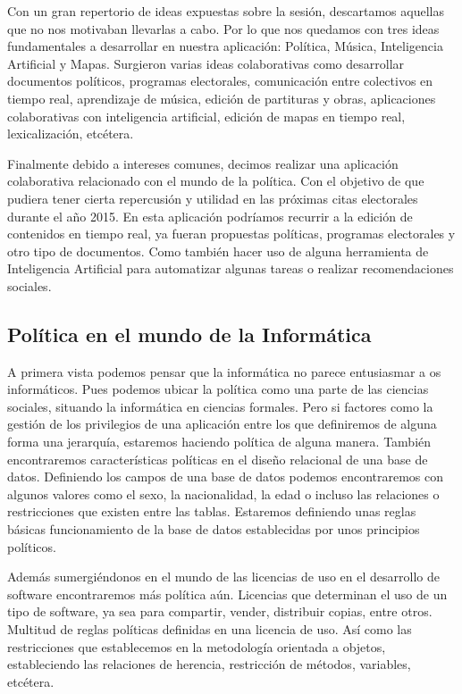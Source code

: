 Con un gran repertorio de ideas expuestas sobre la sesión, descartamos aquellas que no nos motivaban llevarlas a cabo. Por lo que nos quedamos con tres ideas fundamentales a desarrollar en nuestra aplicación: Política, Música, Inteligencia Artificial y Mapas. Surgieron varias ideas colaborativas como desarrollar documentos políticos, programas electorales, comunicación entre colectivos en tiempo real, aprendizaje de música, edición de partituras y obras, aplicaciones colaborativas con inteligencia artificial, edición de mapas en tiempo real, lexicalización, etcétera.

Finalmente debido a intereses comunes, decimos realizar una aplicación colaborativa relacionado con el mundo de la política. Con el objetivo de que pudiera tener cierta repercusión y utilidad en las próximas citas electorales durante el año 2015. En esta aplicación podríamos recurrir a la edición de contenidos en tiempo real, ya fueran propuestas políticas, programas electorales y otro tipo de documentos. Como también hacer uso de alguna herramienta de Inteligencia Artificial para automatizar algunas tareas o realizar recomendaciones sociales.

\subsection{Política en el mundo de la Informática}

A primera vista podemos pensar que la informática no parece entusiasmar a os informáticos. Pues podemos ubicar la política como una parte de las ciencias sociales, situando la informática en ciencias formales. Pero si factores como la gestión de los privilegios de una aplicación entre los que definiremos de alguna forma una jerarquía, estaremos haciendo política de alguna manera. También encontraremos características políticas en el diseño relacional de una base de datos. Definiendo los campos de una base de datos podemos encontraremos con algunos valores como el sexo, la nacionalidad, la edad o incluso las relaciones o restricciones que existen entre las tablas. Estaremos definiendo unas reglas básicas funcionamiento de la base de datos establecidas por unos principios políticos.

Además sumergiéndonos en el mundo de las licencias de uso en el desarrollo de software encontraremos más política aún. Licencias que determinan el uso de un tipo de software, ya sea para compartir, vender, distribuir copias, entre otros. Multitud de reglas políticas definidas en una licencia de uso. Así como las restricciones que establecemos en la metodología orientada a objetos, estableciendo las relaciones de herencia, restricción de métodos, variables, etcétera.

